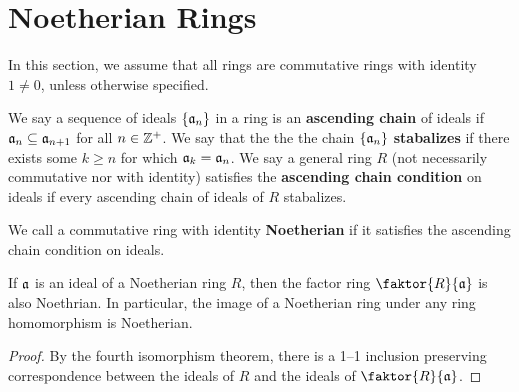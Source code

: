 \section{Noetherian Rings}
\label{section_5.9}

In this section, we assume that all rings are commutative rings with
identity $1 \neq 0$, unless otherwise specified.

\begin{definition}
  We say a sequence of ideals $\{\mathfrak{a}_n\}$ in a ring is an
  \textbf{ascending chain} of ideals if $\mathfrak{a}_n \subseteq \mathfrak{a}_{n+1}$
  for all $n \in \mathbb{Z}^+$. We say that the the the chain $\{\mathfrak{a}_n\}$
  \textbf{stabalizes} if there exists some $k \geq n$ for which
  $\mathfrak{a}_k=\mathfrak{a}_n$. We say a general ring $R$ (not necessarily commutative
  nor with identity) satisfies the \textbf{ascending chain condition}
  on ideals if every ascending chain of ideals of $R$ stabalizes.
\end{definition}

\begin{definition}
  We call a commutative ring with identity \textbf{Noetherian} if it
  satisfies the ascending chain condition on ideals.
\end{definition}

\begin{proposition}\label{proposition_5.9.1}
  If $\mathfrak{a}$ is an ideal of a Noetherian ring  $R$, then the factor ring
  $\faktor{R}{\af}$ is also Noethrian. In particular, the image of a Noetherian
  ring under any ring homomorphism is Noetherian.
\end{proposition}
\begin{proof}
    By the fourth isomorphism theorem, there is a 1--1 inclusion
    preserving correspondence between the ideals of $R$ and the ideals
    of $\faktor{R}{\af}$.
\end{proof}

